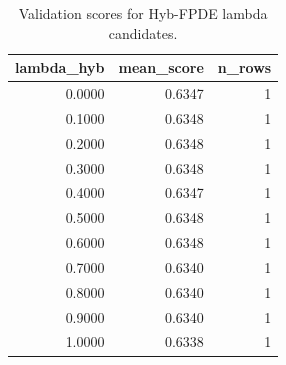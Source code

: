 \begin{table}[t]
\caption{Validation scores for Hyb-FPDE lambda candidates.}
\label{tab:lambda_distribution_computed}
\centering
\begin{tabular}{rrr}
\toprule
lambda\_hyb & mean\_score & n\_rows \\
\midrule
0.0000 & 0.6347 & 1 \\
0.1000 & 0.6348 & 1 \\
0.2000 & 0.6348 & 1 \\
0.3000 & 0.6348 & 1 \\
0.4000 & 0.6347 & 1 \\
0.5000 & 0.6348 & 1 \\
0.6000 & 0.6348 & 1 \\
0.7000 & 0.6340 & 1 \\
0.8000 & 0.6340 & 1 \\
0.9000 & 0.6340 & 1 \\
1.0000 & 0.6338 & 1 \\
\bottomrule
\end{tabular}

\end{table}
